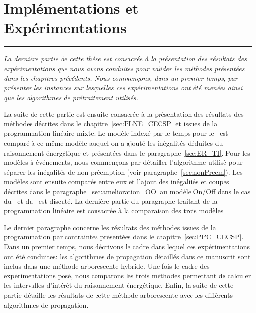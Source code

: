 \cleardoublepage
\begin{minipage}{0.95\linewidth}

\part{Implémentations et Expérimentations}
\vspace{15mm} %
\parttoc 
\end{minipage}
\newpage
\thispagestyle{empty}
\begin{center}
  \begin{minipage}{\textwidth}
    \hrule
    \vspace{0.5cm}
    {\it  La dernière partie de cette thèse est consacrée à la
      présentation des résultats des expérimentations que nous avons
      conduites pour valider les méthodes présentées dans les
      chapitres précédents. Nous commençons, dans un premier temps,
      par présenter les instances sur lesquelles ces expérimentations
      ont été menées ainsi que les algorithmes de prétraitement
      utilisés. 

      La suite de cette partie est ensuite consacrée à la présentation
      des résultats des méthodes décrites dans le
      chapitre~\ref{sec:PLNE_CECSP} et issues de la programmation linéaire
      mixte. Le modèle indexé par le temps pour le \CECSP~est comparé
      à ce même modèle auquel on a ajouté les inégalités déduites du
      raisonnement énergétique et présentées dans le
      paragraphe~\ref{sec:ER_TI}. Pour les modèles à événements, nous
      commençons par détailler l'algorithme utilisé pour séparer les
      inégalités de non-préemption (voir
      paragraphe~\ref{sec:nonPreem}). Les modèles sont ensuite comparés
      entre eux et l'ajout des inégalités et coupes décrites dans le
      paragraphe~\ref{sec:amelioration_OO} au modèle On/Off dans le cas du
      \CECSP~et du \RCPSP~est discuté. La dernière partie du paragraphe
      traitant de la programmation linéaire est consacrée à la comparaison
      des trois modèles.

      Le dernier paragraphe concerne les résultats des méthodes issues de
      la programmation par contraintes présentées dans le
      chapitre~\ref{sec:PPC_CECSP}. Dans un premier temps, nous
      décrivons le cadre dans lequel ces expérimentations ont été
      conduites: les algorithmes de propagation détaillés dans ce manuscrit
      sont inclus dans une méthode arborescente hybride. Une fois le cadre
      des expérimentations posé, nous comparons les trois méthodes permettant
      de calculer les intervalles d'intérêt du raisonnement
      énergétique. Enfin, la suite de cette partie détaille les résultats de
      cette méthode arborescente avec les différents algorithmes de
      propagation. 

}
\end{minipage}
\end{center}
